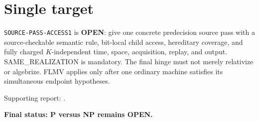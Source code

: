 \documentclass[11pt]{article}
\begin{document}
\section*{Single target}
\texttt{SOURCE-PASS-ACCESS1} is \textbf{OPEN}: give one concrete
predecision source pass with a source-checkable semantic rule, bit-local
child access, hereditary coverage, and fully charged $K$-independent time,
space, acquisition, replay, and output.  SAME\_REALIZATION is mandatory.
The final hinge must not merely relativize or algebrize.  FLMV applies only
after one ordinary machine satisfies its simultaneous endpoint hypotheses.

Supporting report:
.

\bigskip
\textbf{Final status: P versus NP remains OPEN.}

\end{document}
